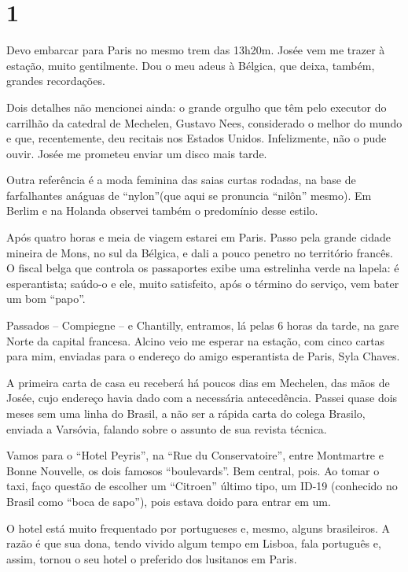 \section*{1 \adfflatleafright {}}

Devo embarcar para Paris no mesmo trem das 13h20m. Josée vem me trazer à estação, muito gentilmente. Dou o meu adeus à Bélgica, que deixa, também, grandes recordações.

Dois detalhes não mencionei ainda: o grande orgulho que têm pelo executor do carrilhão da catedral de Mechelen, Gustavo Nees, considerado o melhor do mundo e que, recentemente, deu recitais nos Estados Unidos. Infelizmente, não o pude ouvir. Josée me prometeu enviar um disco mais tarde.

Outra referência é a moda feminina das saias curtas rodadas, na base de farfalhantes anáguas de “nylon”(que aqui se pronuncia “nilôn” mesmo). Em Berlim e na Holanda observei também o predomínio desse estilo.

Após quatro horas e meia de viagem estarei em Paris. Passo pela grande cidade mineira de Mons, no sul da Bélgica, e dali a pouco penetro no território francês. O fiscal belga que controla os passaportes exibe uma estrelinha verde na lapela: é esperantista; saúdo-o e ele, muito satisfeito, após o término do serviço, vem bater um bom “papo”.

Passados -- Compiegne -- e Chantilly, entramos, lá pelas 6 horas da tarde, na gare Norte da capital francesa. Alcino veio me esperar na estação, com cinco cartas para mim, enviadas para o endereço do amigo esperantista de Paris, Syla Chaves.

A primeira carta de casa eu receberá há poucos dias em Mechelen, das mãos de Josée, cujo endereço havia dado com a necessária antecedência. Passei quase dois meses sem uma linha do Brasil, a não ser a rápida carta do colega Brasilo, enviada a Varsóvia, falando sobre o assunto de sua revista técnica.

Vamos para o “Hotel Peyris”, na “Rue du Conservatoire”, entre Montmartre e Bonne Nouvelle, os dois famosos “boulevards”. Bem central, pois. Ao tomar o taxi, faço questão de escolher um “Citroen” último tipo, um ID-19 (conhecido no Brasil como “boca de sapo”), pois estava doido para entrar em um.

O hotel está muito frequentado por portugueses e, mesmo, alguns brasileiros. A razão é que sua dona, tendo vivido algum tempo em Lisboa, fala português e, assim, tornou o seu hotel o preferido dos lusitanos em Paris.

